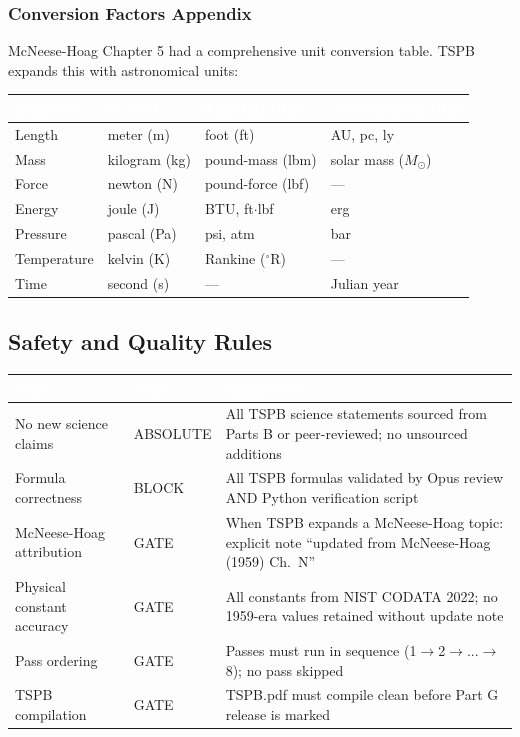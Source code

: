 \documentclass[11pt,letterpaper]{article}
\newcommand{\tableheader}[1]{\textbf{\sffamily\textcolor{white}{#1}}}
\begin{document}
\subsubsection{Conversion Factors Appendix}

McNeese-Hoag Chapter 5 had a comprehensive unit conversion table. TSPB expands this with astronomical units:

\begin{center}
\begin{tabularx}{\textwidth}{L{3cm}L{3cm}L{3cm}X}
\toprule
{}
\tableheader{Quantity} & \tableheader{SI Unit} & \tableheader{Imperial Unit} & \tableheader{Astronomical Unit} \\
\midrule
Length & meter (m) & foot (ft) & AU, pc, ly \\
Mass & kilogram (kg) & pound-mass (lbm) & solar mass ($M_\odot$) \\
Force & newton (N) & pound-force (lbf) & --- \\
Energy & joule (J) & BTU, ft$\cdot$lbf & erg \\
Pressure & pascal (Pa) & psi, atm & bar \\
Temperature & kelvin (K) & Rankine ($^\circ$R) & --- \\
Time & second (s) & --- & Julian year \\
\bottomrule
\end{tabularx}
\end{center}

\subsection{Safety and Quality Rules}

\begin{center}
\begin{tabularx}{\textwidth}{L{3cm}L{2cm}X}
\toprule
{}
\tableheader{Rule} & \tableheader{Type} & \tableheader{Application} \\
\midrule
No new science claims & ABSOLUTE & All TSPB science statements sourced from Parts B or peer-reviewed; no unsourced additions \\
Formula correctness & BLOCK & All TSPB formulas validated by Opus review AND Python verification script \\
McNeese-Hoag attribution & GATE & When TSPB expands a McNeese-Hoag topic: explicit note ``updated from McNeese-Hoag (1959) Ch.\ N'' \\
Physical constant accuracy & GATE & All constants from NIST CODATA 2022; no 1959-era values retained without update note \\
Pass ordering & GATE & Passes must run in sequence (1$\to$2$\to$...$\to$8); no pass skipped \\
TSPB compilation & GATE & TSPB.pdf must compile clean before Part G release is marked \\
\bottomrule
\end{tabularx}
\end{center}
\end{document}
